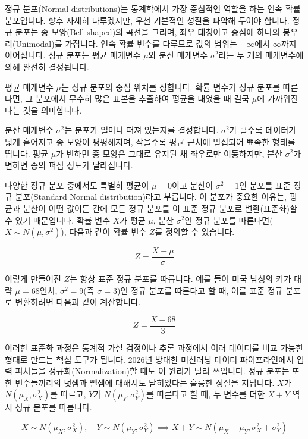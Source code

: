 \documentclass[
]{scrbook}
\begin{document}
정규 분포(Normal distributions)는 통계학에서 가장 중심적인 역할을 하는
연속 확률 분포입니다. 향후 자세히 다루겠지만, 우선 기본적인 성질을
파악해 두어야 합니다. 정규 분포는 종 모양(Bell-shaped)의 곡선을 그리며,
좌우 대칭이고 중심에 하나의 봉우리(Unimodal)를 가집니다. 연속 확률
변수를 다루므로 값의 범위는 \(-\infty\)에서 \(\infty\)까지 이어집니다.
정규 분포는 평균 매개변수 \(\mu\)와 분산 매개변수 \(\sigma^2\)라는 두
개의 매개변수에 의해 완전히 결정됩니다.

평균 매개변수 \(\mu\)는 정규 분포의 중심 위치를 정합니다. 확률 변수가
정규 분포를 따른다면, 그 분포에서 무수히 많은 표본을 추출하여 평균을
내었을 때 결국 \(\mu\)에 가까워진다는 것을 의미합니다.

분산 매개변수 \(\sigma^2\)는 분포가 얼마나 퍼져 있는지를 결정합니다.
\(\sigma^2\)가 클수록 데이터가 넓게 흩어지고 종 모양이 평평해지며,
작을수록 평균 근처에 밀집되어 뾰족한 형태를 띱니다. 평균 \(\mu\)가
변하면 종 모양은 그대로 유지된 채 좌우로만 이동하지만, 분산
\(\sigma^2\)가 변하면 종의 퍼짐 정도가 달라집니다.

다양한 정규 분포 중에서도 특별히 평균이 \(\mu = 0\)이고 분산이
\(\sigma^2 = 1\)인 분포를 표준 정규 분포(Standard Normal
distribution)라고 부릅니다. 이 분포가 중요한 이유는, 평균과 분산이 어떤
값이든 간에 모든 정규 분포를 이 표준 정규 분포로 변환(표준화)할 수 있기
때문입니다. 확률 변수 \(X\)가 평균 \(\mu\), 분산 \(\sigma^2\)인 정규
분포를 따른다면(\(X \sim N(\mu, \sigma^2)\)), 다음과 같이 확률 변수
\(Z\)를 정의할 수 있습니다.

\[
Z = \frac{X - \mu}{\sigma}
\]

이렇게 만들어진 \(Z\)는 항상 표준 정규 분포를 따릅니다. 예를 들어 미국
남성의 키가 대략 \(\mu = 68\)인치, \(\sigma^2 = 9\)(즉 \(\sigma = 3\))인
정규 분포를 따른다고 할 때, 이를 표준 정규 분포로 변환하려면 다음과 같이
계산합니다.

\[
Z = \frac{X - 68}{3}
\]

이러한 표준화 과정은 통계적 가설 검정이나 추론 과정에서 여러 데이터를
비교 가능한 형태로 만드는 핵심 도구가 됩니다. 2026년 방대한 머신러닝
데이터 파이프라인에서 입력 피처들을 정규화(Normalization)할 때도 이
원리가 널리 쓰입니다. 정규 분포는 또한 변수들끼리의 덧셈과 뺄셈에
대해서도 닫혀있다는 훌륭한 성질을 지닙니다. \(X\)가
\(N(\mu_X, \sigma_X^2)\)를 따르고, \(Y\)가 \(N(\mu_Y, \sigma_Y^2)\)를
따른다고 할 때, 두 변수를 더한 \(X+Y\) 역시 정규 분포를 따릅니다.

\[
X \sim N(\mu_X, \sigma_X^2), \quad Y \sim N(\mu_Y, \sigma_Y^2) \implies X+Y \sim N(\mu_X+\mu_Y, \sigma_X^2+\sigma_Y^2)
\]
\end{document}
